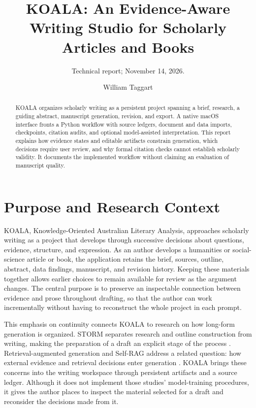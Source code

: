 \documentclass[manuscript,screen,nonacm]{acmart}
\title{KOALA: An Evidence-Aware Writing Studio for Scholarly Articles and Books}
\subtitle{Technical report; November 14, 2026.}
\author{William Taggart}
\affiliation{\department{Modern and Classical Languages and Literatures}\institution{Virginia Tech}\city{Blacksburg}\state{Virginia}\country{USA}}
\begin{document}
\begin{abstract}
KOALA organizes scholarly writing as a persistent project spanning a brief, research, a guiding abstract, manuscript generation, revision, and export. A native macOS interface fronts a Python workflow with source ledgers, document and data imports, checkpoints, citation audits, and optional model-assisted interpretation. This report explains how evidence states and editable artifacts constrain generation, which decisions require user review, and why formal citation checks cannot establish scholarly validity. It documents the implemented workflow without claiming an evaluation of manuscript quality.
\end{abstract}
\maketitle
\section{Purpose and Research Context}

KOALA, Knowledge-Oriented Australian Literary Analysis, approaches scholarly writing as a project that develops through successive decisions about questions, evidence, structure, and expression. As an author develops a humanities or social-science article or book, the application retains the brief, sources, outline, abstract, data findings, manuscript, and revision history. Keeping these materials together allows earlier choices to remain available for review as the argument changes. The central purpose is to preserve an inspectable connection between evidence and prose throughout drafting, so that the author can work incrementally without having to reconstruct the whole project in each prompt.

This emphasis on continuity connects KOALA to research on how long-form generation is organized. STORM separates research and outline construction from writing, making the preparation of a draft an explicit stage of the process \cite{storm}. Retrieval-augmented generation and Self-RAG address a related question: how external evidence and retrieval decisions enter generation \cite{rag,selfrag}. KOALA brings these concerns into the writing workspace through persistent artifacts and a source ledger. Although it does not implement those studies' model-training procedures, it gives the author places to inspect the material selected for a draft and reconsider the decisions made from it.
\end{document}
